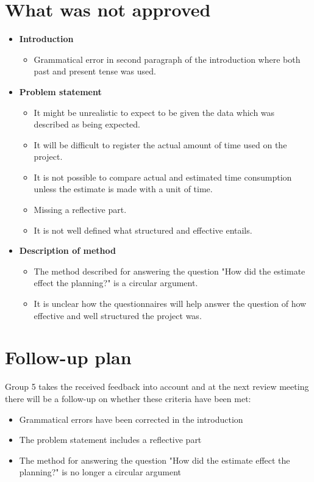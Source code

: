 \documentclass[]{article}
\begin{document}
\section*{What was not approved}
\begin{itemize}
\item \textbf{Introduction}
	\begin{itemize}
	\item Grammatical error in second paragraph of the introduction where both past and present tense was used.
	\end{itemize}

\item \textbf{Problem statement}
	\begin{itemize}
	\item It might be unrealistic to expect to be given the data which was described as being expected.
	\item It will be difficult to register the actual amount of time used on the project.
	\item It is not possible to compare actual and estimated time consumption unless the estimate is made with a unit of time.
	\item Missing a reflective part.
	\item It is not well defined what structured and effective entails.
	\end{itemize}
\item \textbf{Description of method}
	\begin{itemize}
	\item The method described for answering the question "How did the estimate effect the planning?" is a circular argument.
	\item It is unclear how the questionnaires will help answer the question of how effective and well structured the project was.
	\end{itemize}
\end{itemize}

\section*{Follow-up plan}
Group 5 takes the received feedback into account and at the next review meeting there will be a follow-up on whether these criteria have been met: 
\begin{itemize}
\item Grammatical errors have been corrected in the introduction
\item The problem statement includes a reflective part
\item The method for answering the question "How did the estimate effect the planning?" is no longer a circular argument
\end{itemize}
\end{document}
